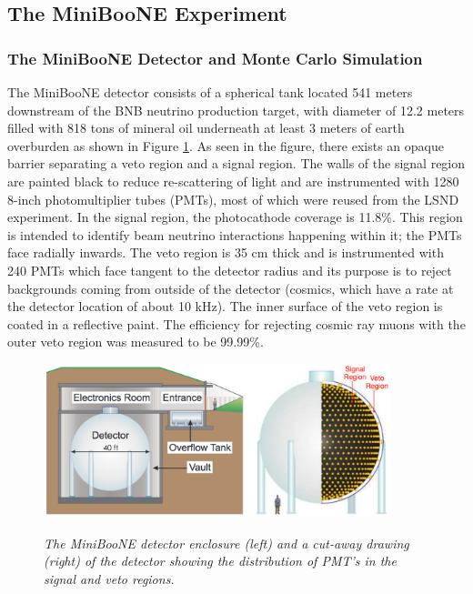 \subsection{The MiniBooNE Experiment}

\subsubsection{The MiniBooNE Detector and Monte Carlo Simulation}



The MiniBooNE detector \cite{MBDetectorPaper} consists of a spherical tank located 541 meters downstream of the BNB neutrino production target, with diameter of 12.2 meters filled with 818 tons of mineral oil underneath at least 3 meters of earth overburden as shown in Figure \ref{MB_detector_fig}. As seen in the figure, there exists an opaque barrier separating a veto region and a signal region. The walls of the signal region are painted black to reduce re-scattering of light and are instrumented with 1280 8-inch photomultiplier tubes (PMTs), most of which were reused from the LSND experiment. In the signal region, the photocathode coverage is 11.8\%. This region is intended to identify beam neutrino interactions happening within it; the PMTs face radially inwards. The veto region is 35 cm thick and is instrumented with 240 PMTs which face tangent to the detector radius and its purpose is to reject backgrounds coming from outside of the detector (cosmics, which have a rate at the detector location of about 10 kHz). The inner surface of the veto region is coated in a reflective paint. The efficiency for rejecting cosmic ray muons with the outer veto region was measured to be 99.99\%.\\

\begin{figure}[ht!]
\centering
	\includegraphics[width=0.9\textwidth]{Figures/MB_detectorpaper_fig.png} \\
\caption{\textit{The MiniBooNE detector enclosure (left) and a cut-away drawing (right) of the detector showing the distribution of PMT's in the signal and veto regions.}}\label{MB_detector_fig}
\end{figure}

